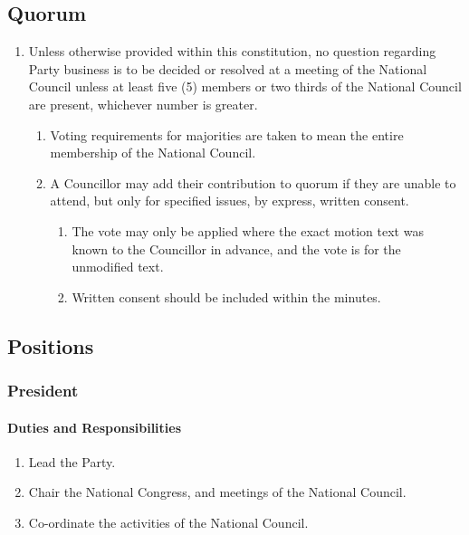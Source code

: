 \documentclass[a4paper,titlepage,8.5pt]{article}
\begin{document}
\subsection{Quorum}

\begin{enumerate}
\item Unless otherwise provided within this constitution, no question regarding Party business is to be decided or resolved at a meeting of the National Council unless at least five (5) members or two thirds of the National Council are present, whichever number is greater.
\begin{enumerate}
\item Voting requirements for majorities are taken to mean the entire membership of the National Council.
\item A Councillor may add their contribution to quorum if they are unable to attend, but only for specified issues, by express, written consent.
\begin{enumerate}
\item The vote may only be applied where the exact motion text was known to the Councillor in advance, and the vote is for the unmodified text.
\item Written consent should be included within the minutes.
\end{enumerate}
\end{enumerate}
\end{enumerate}


\subsection{Positions}

\subsubsection{President}

\paragraph{Duties and Responsibilities}

\begin{enumerate}
\item Lead the Party.
\item Chair the National Congress, and meetings of the National Council.
\item Co-ordinate the activities of the National Council.
\end{enumerate}
\end{document}
